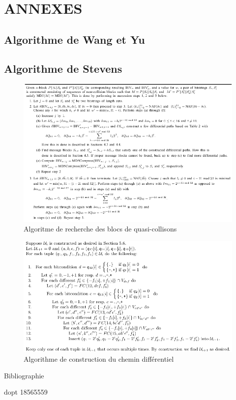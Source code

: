 \documentclass[a4paper,11pt,french]{article}
\begin{document}
\newpage
\vspace{3cm}
\section{ANNEXES}

\subsection{Algorithme de Wang et Yu}



\subsection{Algorithme de Stevens}
\begin{figure}[h!]
  \includegraphics[scale=.61]{./pics/ncb.png}
  \caption{Algoritme de recherche des blocs de quasi-collisons}
\end{figure}

\begin{figure}
  \includegraphics[scale=.61]{./pics/ui.png}
  \caption{Algorithme de construction du chemin différentiel}
\end{figure}


\newpage
\large{Bibliographie}




dopt 18565559
\end{document}
